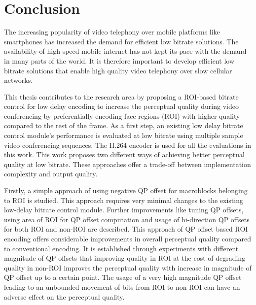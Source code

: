 \chapter{Conclusion} \label{chapter:conclusion}
\thispagestyle{empty}%

The increasing popularity of video telephony over mobile platforms like smartphones has increased the demand for efficient low bitrate solutions. The availability of high speed mobile internet has not kept its pace with the demand in many parts of the world. It is therefore important to develop efficient low bitrate solutions that enable high quality video telephony over slow cellular networks. 

This thesis contributes to the research area by proposing a ROI-based bitrate control for low delay encoding to increase the perceptual quality during video conferencing by preferentially encoding face regions (ROI) with higher quality compared to the rest of the frame. As a first step, an existing low delay bitrate control module's performance is evaluated at low bitrate using multiple sample video conferencing sequences. The H.264 encoder is used for all the evaluations in this work. This work proposes two different ways of achieving better perceptual quality at low bitrate. These approaches offer a trade-off between implementation complexity and output quality. 

Firstly, a simple approach of using negative QP offset for macroblocks belonging to ROI is studied. This approach requires very minimal changes to the existing low-delay bitrate control module. Further improvements like tuning QP offsets, using area of ROI for QP offset computation and usage of bi-direction QP offsets for both ROI and non-ROI are described. This approach of QP offset based ROI encoding offers considerable improvements in overall perceptual quality compared to conventional encoding. It is established through experiments with different magnitude of QP offsets that improving quality in ROI at the cost of degrading quality in non-ROI improves the perceptual quality with increase in magnitude of QP offset up to a certain point. The usage of a very high magnitude QP offset leading to an unbounded movement of bits from ROI to non-ROI can have an adverse effect on the perceptual quality.


